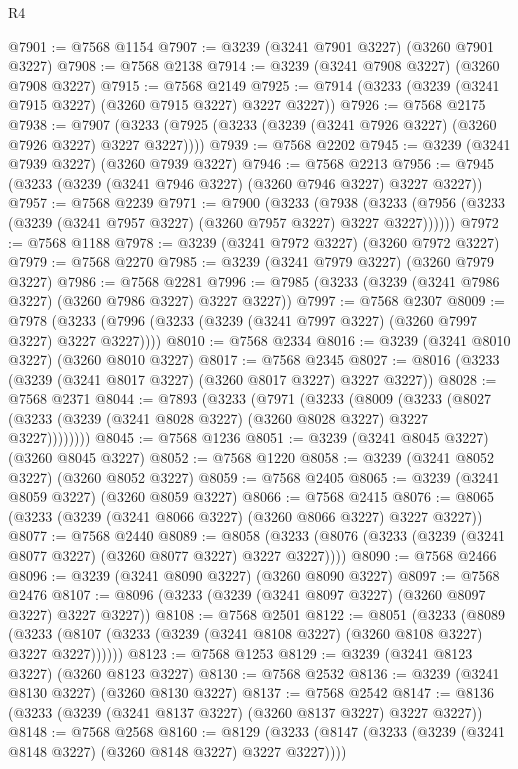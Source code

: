 \begin{lexlean}{R4}
\begin{coremodule}
@7901 := @7568 @1154
@7907 := @3239 (@3241 @7901 @3227) (@3260 @7901 @3227)
@7908 := @7568 @2138
@7914 := @3239 (@3241 @7908 @3227) (@3260 @7908 @3227)
@7915 := @7568 @2149
@7925 := @7914 (@3233 (@3239 (@3241 @7915 @3227) (@3260 @7915 @3227) @3227 @3227))
@7926 := @7568 @2175
@7938 := @7907 (@3233 (@7925 (@3233 (@3239 (@3241 @7926 @3227) (@3260 @7926 @3227) @3227 @3227))))
@7939 := @7568 @2202
@7945 := @3239 (@3241 @7939 @3227) (@3260 @7939 @3227)
@7946 := @7568 @2213
@7956 := @7945 (@3233 (@3239 (@3241 @7946 @3227) (@3260 @7946 @3227) @3227 @3227))
@7957 := @7568 @2239
@7971 := @7900
    (@3233
      (@7938 (@3233 (@7956 (@3233 (@3239 (@3241 @7957 @3227) (@3260 @7957 @3227) @3227 @3227))))))
@7972 := @7568 @1188
@7978 := @3239 (@3241 @7972 @3227) (@3260 @7972 @3227)
@7979 := @7568 @2270
@7985 := @3239 (@3241 @7979 @3227) (@3260 @7979 @3227)
@7986 := @7568 @2281
@7996 := @7985 (@3233 (@3239 (@3241 @7986 @3227) (@3260 @7986 @3227) @3227 @3227))
@7997 := @7568 @2307
@8009 := @7978 (@3233 (@7996 (@3233 (@3239 (@3241 @7997 @3227) (@3260 @7997 @3227) @3227 @3227))))
@8010 := @7568 @2334
@8016 := @3239 (@3241 @8010 @3227) (@3260 @8010 @3227)
@8017 := @7568 @2345
@8027 := @8016 (@3233 (@3239 (@3241 @8017 @3227) (@3260 @8017 @3227) @3227 @3227))
@8028 := @7568 @2371
@8044 := @7893
    (@3233
      (@7971
        (@3233
          (@8009
            (@3233 (@8027 (@3233 (@3239 (@3241 @8028 @3227) (@3260 @8028 @3227) @3227 @3227))))))))
@8045 := @7568 @1236
@8051 := @3239 (@3241 @8045 @3227) (@3260 @8045 @3227)
@8052 := @7568 @1220
@8058 := @3239 (@3241 @8052 @3227) (@3260 @8052 @3227)
@8059 := @7568 @2405
@8065 := @3239 (@3241 @8059 @3227) (@3260 @8059 @3227)
@8066 := @7568 @2415
@8076 := @8065 (@3233 (@3239 (@3241 @8066 @3227) (@3260 @8066 @3227) @3227 @3227))
@8077 := @7568 @2440
@8089 := @8058 (@3233 (@8076 (@3233 (@3239 (@3241 @8077 @3227) (@3260 @8077 @3227) @3227 @3227))))
@8090 := @7568 @2466
@8096 := @3239 (@3241 @8090 @3227) (@3260 @8090 @3227)
@8097 := @7568 @2476
@8107 := @8096 (@3233 (@3239 (@3241 @8097 @3227) (@3260 @8097 @3227) @3227 @3227))
@8108 := @7568 @2501
@8122 := @8051
    (@3233
      (@8089 (@3233 (@8107 (@3233 (@3239 (@3241 @8108 @3227) (@3260 @8108 @3227) @3227 @3227))))))
@8123 := @7568 @1253
@8129 := @3239 (@3241 @8123 @3227) (@3260 @8123 @3227)
@8130 := @7568 @2532
@8136 := @3239 (@3241 @8130 @3227) (@3260 @8130 @3227)
@8137 := @7568 @2542
@8147 := @8136 (@3233 (@3239 (@3241 @8137 @3227) (@3260 @8137 @3227) @3227 @3227))
@8148 := @7568 @2568
@8160 := @8129 (@3233 (@8147 (@3233 (@3239 (@3241 @8148 @3227) (@3260 @8148 @3227) @3227 @3227))))

\end{coremodule}
\end{lexlean}
